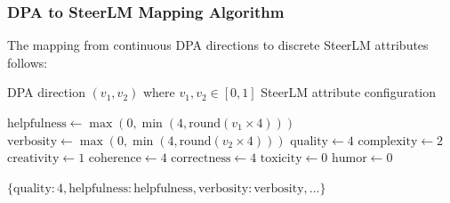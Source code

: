 \documentclass{article} %
\begin{document}
\subsubsection{DPA to SteerLM Mapping Algorithm}

The mapping from continuous DPA directions to discrete SteerLM attributes follows:

\begin{algorithm}[H]
\caption{DPA-to-SteerLM Attribute Mapping}
\begin{algorithmic}[1]
\REQUIRE DPA direction $(v_1, v_2)$ where $v_1, v_2 \in [0,1]$
\ENSURE SteerLM attribute configuration

\STATE $\text{helpfulness} \leftarrow \max(0, \min(4, \text{round}(v_1 \times 4)))$
\STATE $\text{verbosity} \leftarrow \max(0, \min(4, \text{round}(v_2 \times 4)))$
\STATE $\text{quality} \leftarrow 4$ 
\STATE $\text{complexity} \leftarrow 2$ 
\STATE $\text{creativity} \leftarrow 1$ 
\STATE $\text{coherence} \leftarrow 4$ 
\STATE $\text{correctness} \leftarrow 4$ 
\STATE $\text{toxicity} \leftarrow 0$ 
\STATE $\text{humor} \leftarrow 0$ 

\RETURN $\{\text{quality}: 4, \text{helpfulness}: \text{helpfulness}, \text{verbosity}: \text{verbosity}, \ldots\}$
\end{algorithmic}
\end{algorithm}
\end{document}
